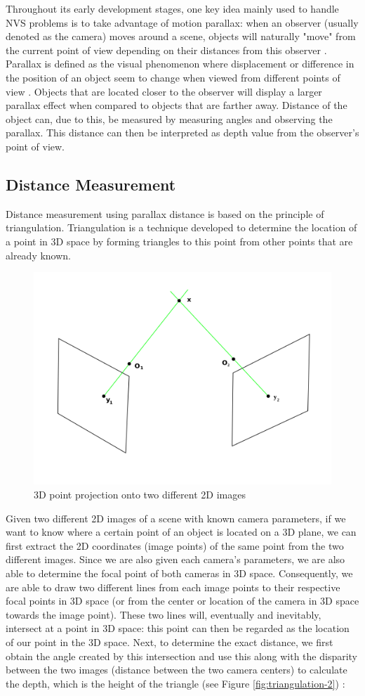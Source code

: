 Throughout its early development stages, one key idea mainly used to handle NVS problems is to take advantage of motion parallax: when an observer (usually denoted as the camera) moves around a scene, objects will naturally "move" from the current point of view depending on their distances from this observer \parencite{cvbook2001}. Parallax is defined as the visual phenomenon where displacement or difference in the position of an object seem to change when viewed from different points of view \parencite{CambridgeParallax}. Objects that are located closer to the observer will display a larger parallax effect when compared to objects that are farther away. Distance of the object can, due to this, be measured by measuring angles and observing the parallax. This distance can then be interpreted as depth value from the observer's point of view.

\subsection{Distance Measurement}

Distance measurement using parallax distance is based on the principle of triangulation. Triangulation is a technique developed to determine the location of a point in 3D space by forming triangles to this point from other points that are already known.

\begin{figure}[h]
    \centering
    \includegraphics[width=0.5\linewidth]{figures/triangulation_example_01.png}
    \caption{3D point projection onto two different 2D images}
    \label{fig:triangulation-1}
\end{figure}

Given two different 2D images of a scene with known camera parameters, if we want to know where a certain point of an object is located on a 3D plane, we can first extract the 2D coordinates (image points) of the same point from the two different images. Since we are also given each camera's parameters, we are also able to determine the focal point of both cameras in 3D space. Consequently, we are able to draw two different lines from each image points to their respective focal points in 3D space (or from the center or location of the camera in 3D space towards the image point). These two lines will, eventually and inevitably, intersect at a point in 3D space: this point can then be regarded as the location of our point in the 3D space. Next, to determine the exact distance, we first obtain the angle created by this intersection and use this along with the disparity between the two images (distance between the two camera centers) to calculate the depth, which is the height of the triangle (see Figure \ref{fig:triangulation-2}) \parencite{triangulation}:

